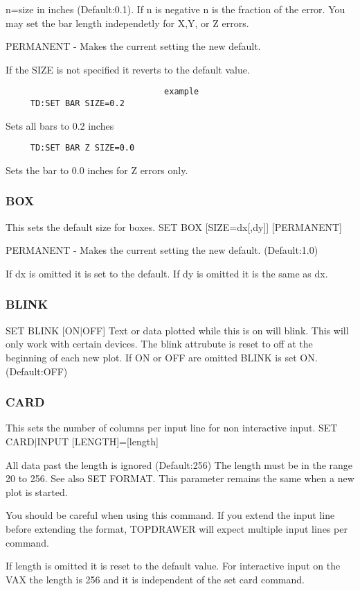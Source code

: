 n=size  in inches (Default:0.1).  If n is negative n is the fraction of
the error.  You may set the bar  length  independetly  for  X,Y,  or  Z
errors.  

PERMANENT - Makes the current setting the new default.  

If the SIZE is not specified it reverts to the default value.  
\begin{verbatim}
                                example
     TD:SET BAR SIZE=0.2 
\end{verbatim}
Sets all bars to 0.2 inches 
\begin{verbatim}
     TD:SET BAR Z SIZE=0.0 
\end{verbatim}
Sets the bar to 0.0 inches for Z errors only.  
\subsubsection{BOX}
This sets the default size for boxes.  
SET BOX [SIZE=dx[,dy]] [PERMANENT] 

PERMANENT - Makes the current setting the new default.  
(Default:1.0) 

If  dx is omitted it is set to the default.  If dy is omitted it is the
same as dx.  
\subsubsection{BLINK}
SET BLINK [ON$|$OFF] 
Text  or data plotted while this is on will blink.  This will only work
with certain devices.  The blink attrubute  is  reset  to  off  at  the
beginning of each new plot.  If ON or OFF are omitted BLINK is set ON. 
(Default:OFF) 
\subsubsection{CARD}
This  sets  the  number  of  columns per input line for non interactive
input.  
SET CARD$|$INPUT [LENGTH]=[length] 

All data past the length is ignored (Default:256) The length must be in
the range 20 to 256.  See also SET FORMAT.  This parameter remains  the
same when a new plot is started.  

You should be careful when using this command.  If you extend the input
line before extending the format, TOPDRAWER will expect multiple  input
lines per command.  

If length is omitted it is reset to the default value.  For interactive
input on the VAX the length is 256 and it is  independent  of  the  set
card command.  
